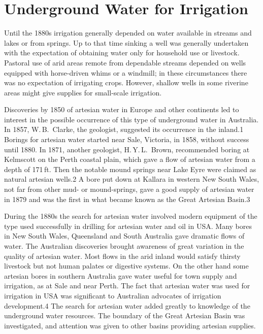 
\chapter{Underground Water for Irrigation}

Until the 1880s irrigation generally depended on water available in
streams and lakes or from springs.  Up to that time sinking a well was
generally undertaken with the expectation of obtaining water only for
household use or livestock.  Pastoral use of arid areas remote from
dependable streams depended on wells equipped with horse-driven whims
or a windmill; in these circumstances there was no expectation of
irrigating crops.  However, shallow wells in some riverine areas might
give supplies for small-scale irrigation.

Discoveries by 1850 of artesian water in Europe and other continents
led to interest in the possible occurrence of this type of underground
water in Australia.  In 1857, W.\,B.~Clarke, the geologist, suggested
its occurrence in the inland.1 Borings for artesian water started near
Sale, Victoria, in 1858, without success until 1880.  In 1871, another
geologist, H.\,Y.\,L.~Brown, recommended boring at Kelmscott on the
Perth coastal plain, which gave a flow of artesian water from a depth
of 171\,ft.  Then the notable mound springs near Lake Eyre were
claimed as natural artesian wells.2 A bore put down at Kallara in
western New South Wales, not far from other mud- or mound-springs,
gave a good supply of artesian water in 1879 and was the first in what
became known as the Great Artesian Basin.3

During the 1880s the search for artesian water involved modern
equipment of the type used successfully in drilling for artesian water
and oil in USA.  Many bores in New South Wales, Queensland and South
Australia gave dramatic flows of water.  The Australian discoveries
brought awareness of great variation in the quality of artesian water.
Most flows in the arid inland would satisfy thirsty livestock but not
human palates or digestive systems.  On the other hand some artesian
bores in southern Australia gave water useful for town supply and
irrigation, as at Sale and near Perth.  The fact that artesian water
was used for irrigation in USA was significant to Australian advocates
of irrigation development.4 The search for artesian water added
greatly to knowledge of the underground water resources.  The boundary
of the Great Artesian Basin was investigated, and attention was given
to other basins providing artesian supplies.

